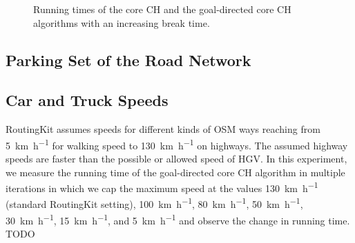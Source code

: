 \begin{figure}[hbtp]
	\centering
	\hfill
	\caption{Running times of the core CH and the goal-directed core CH algorithms with an increasing break time.}
	\label{fig:eval_break_time}
\end{figure}


\subsection{Parking Set of the Road Network}


\subsection{Car and Truck Speeds}
RoutingKit assumes speeds for different kinds of OSM ways reaching from \SI[per-mode = symbol]{5}{\kilo\meter\per\hour} for walking speed to \SI[per-mode = symbol]{130}{\kilo\meter\per\hour} on highways. The assumed highway speeds are faster than the possible or allowed speed of HGV. In this experiment, we measure the running time of the goal-directed core CH algorithm in multiple iterations in which we cap the maximum speed at the values \SI[per-mode = symbol]{130}{\kilo\meter\per\hour} (standard RoutingKit setting), \SI[per-mode = symbol]{100}{\kilo\meter\per\hour}, \SI[per-mode = symbol]{80}{\kilo\meter\per\hour}, \SI[per-mode = symbol]{50}{\kilo\meter\per\hour}, \SI[per-mode = symbol]{30}{\kilo\meter\per\hour}, \SI[per-mode = symbol]{15}{\kilo\meter\per\hour}, and \SI[per-mode = symbol]{5}{\kilo\meter\per\hour} and observe the change in running time. TODO

